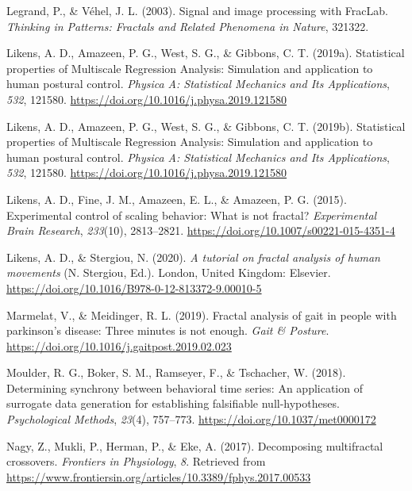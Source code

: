 \documentclass[
  man]{apa6}
\newlength{\cslhangindent}
\newlength{\cslentryspacingunit} %
\newenvironment{CSLReferences}[2] %
 {%
  \setlength{\parindent}{0pt}
  \ifodd #1
  \let\oldpar\par
  \def\par{\hangindent=\cslhangindent\oldpar}
  \fi
  \setlength{\parskip}{#2\cslentryspacingunit}
 }%
 {}
\begin{document}
\begin{CSLReferences}{1}{0}
\leavevmode{}%
Legrand, P., \& Véhel, J. L. (2003). Signal and image processing with FracLab. \emph{Thinking in Patterns: Fractals and Related Phenomena in Nature}, 321322.

\leavevmode{}%
Likens, A. D., Amazeen, P. G., West, S. G., \& Gibbons, C. T. (2019a). Statistical properties of {Multiscale} {Regression} {Analysis}: {Simulation} and application to human postural control. \emph{Physica A: Statistical Mechanics and Its Applications}, \emph{532}, 121580. \url{https://doi.org/10.1016/j.physa.2019.121580}

\leavevmode{}%
Likens, A. D., Amazeen, P. G., West, S. G., \& Gibbons, C. T. (2019b). Statistical properties of Multiscale Regression Analysis: Simulation and application to human postural control. \emph{Physica A: Statistical Mechanics and Its Applications}, \emph{532}, 121580. \url{https://doi.org/10.1016/j.physa.2019.121580}

\leavevmode{}%
Likens, A. D., Fine, J. M., Amazeen, E. L., \& Amazeen, P. G. (2015). Experimental control of scaling behavior: What is not fractal? \emph{Experimental Brain Research}, \emph{233}(10), 2813--2821. \url{https://doi.org/10.1007/s00221-015-4351-4}

\leavevmode{}%
Likens, A. D., \& Stergiou, N. (2020). \emph{A tutorial on fractal analysis of human movements} (N. Stergiou, Ed.). London, United Kingdom: Elsevier. \url{https://doi.org/10.1016/B978-0-12-813372-9.00010-5}

\leavevmode{}%
Marmelat, V., \& Meidinger, R. L. (2019). Fractal analysis of gait in people with parkinson{'}s disease: Three minutes is not enough. \emph{Gait \& Posture}. \url{https://doi.org/10.1016/j.gaitpost.2019.02.023}

\leavevmode{}%
Moulder, R. G., Boker, S. M., Ramseyer, F., \& Tschacher, W. (2018). Determining synchrony between behavioral time series: An application of surrogate data generation for establishing falsifiable null-hypotheses. \emph{Psychological Methods}, \emph{23}(4), 757--773. \url{https://doi.org/10.1037/met0000172}

\leavevmode{}%
Nagy, Z., Mukli, P., Herman, P., \& Eke, A. (2017). Decomposing multifractal crossovers. \emph{Frontiers in Physiology}, \emph{8}. Retrieved from \url{https://www.frontiersin.org/articles/10.3389/fphys.2017.00533}


\end{CSLReferences}
\end{document}
